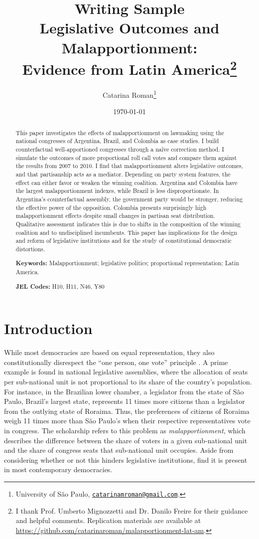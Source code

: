 \documentclass[a4paper,12pt]{article}
\title{{\Large Writing Sample} \\ Legislative Outcomes and Malapportionment: \\ Evidence from Latin America\thanks{I thank Prof. Umberto Mignozzetti and Dr. Danilo Freire for their guidance and helpful comments. Replication materials are available at \url{https://github.com/catarinaroman/malapportionment-lat-am}.}}
\author{Catarina Roman\thanks{University of São Paulo, \href{mailto:catarinamroman@gmail.com}{\texttt{catarinamroman@gmail.com}}.}}
\date{\today}
\begin{document}
\maketitle


\begin{abstract}
\noindent This paper investigates the effects of malapportionment on lawmaking using the national congresses of Argentina, Brazil, and Colombia as case studies. I build counterfactual well-apportioned congresses through a naïve correction method. I simulate the outcomes of more proportional roll call votes and compare them against the results from 2007 to 2010. I find that malapportionment alters legislative outcomes, and that partisanship acts as a mediator. Depending on party system features, the effect can either favor or weaken the winning coalition. Argentina and Colombia have the largest malapportionment indexes, while Brazil is less disproportionate. In Argentina's counterfactual assembly, the government party would be stronger, reducing the effective power of the opposition. Colombia presents surprisingly high malapportionment effects despite small changes in partisan seat distribution. Qualitative assessment indicates this is due to shifts in the composition of the winning coalition and to undisciplined incumbents. This paper has implications for the design and reform of legislative institutions and for the study of constitutional democratic distortions.
\vspace{.4cm}

\noindent \textbf{Keywords:} Malapportionment; legislative politics; proportional representation; Latin America.

\noindent \textbf{JEL Codes:} H10, H11, N46, Y80
\end{abstract}

\newpage

\section{Introduction}
\label{sec:intro}

While most democracies are based on equal representation, they also constitutionally disrespect the ``one person, one vote'' principle \citep{dahl1973polyarchy}. A prime example is found in national legislative assemblies, where the allocation of seats per sub-national unit is not proportional to its share of the country's population. For instance, in the Brazilian lower chamber, a legislator from the state of São Paulo, Brazil's largest state, represents 11 times more citizens than a legislator from the outlying state of Roraima. Thus, the preferences of citizens of Roraima weigh 11 times more than São Paulo's when their respective representatives vote in congress. The scholarship refers to this problem as \textit{malapportionment}, which describes the difference between the share of voters in a given sub-national unit and the share of congress seats that sub-national unit occupies. Aside from considering whether or not this hinders legislative institutions, \citet{samuels2001value} find it is present in most contemporary democracies.
\end{document}
